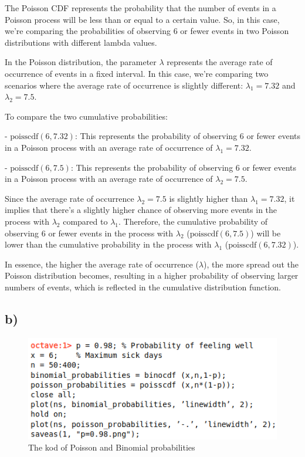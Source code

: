 \documentclass[12pt]{article}
\begin{document}
The Poisson CDF represents the probability that the number of events in a Poisson process will be less than or equal to a certain value. So, in this case, we're comparing the probabilities of observing 6 or fewer events in two Poisson distributions with different lambda values.

In the Poisson distribution, the parameter $\lambda$ represents the average rate of occurrence of events in a fixed interval. In this case, we're comparing two scenarios where the average rate of occurrence is slightly different: $\lambda_1 = 7.32$ and $\lambda_2 = 7.5$.

To compare the two cumulative probabilities:

- $\text{poisscdf}(6, 7.32)$: This represents the probability of observing 6 or fewer events in a Poisson process with an average rate of occurrence of $\lambda_1 = 7.32$.

- $\text{poisscdf}(6, 7.5)$: This represents the probability of observing 6 or fewer events in a Poisson process with an average rate of occurrence of $\lambda_2 = 7.5$.

Since the average rate of occurrence $\lambda_2 = 7.5$ is slightly higher than $\lambda_1 = 7.32$, it implies that there's a slightly higher chance of observing more events in the process with $\lambda_2$ compared to $\lambda_1$. Therefore, the cumulative probability of observing 6 or fewer events in the process with $\lambda_2$ ($\text{poisscdf}(6, 7.5)$) will be lower than the cumulative probability in the process with $\lambda_1$ ($\text{poisscdf}(6, 7.32)$).

In essence, the higher the average rate of occurrence ($\lambda$), the more spread out the Poisson distribution becomes, resulting in a higher probability of observing larger numbers of events, which is reflected in the cumulative distribution function.


\subsection*{b)} 

\begin{figure}[h]
    \centering
    \includegraphics[scale=0.7]{3b_kod}
    \caption{The kod of Poisson and Binomial probabilities}
\end{figure}
\end{document}
